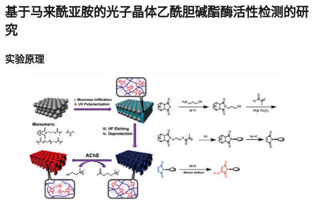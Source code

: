 \documentclass{beamer}
\begin{document}


\subsection{基于马来酰亚胺的光子晶体乙酰胆碱酯酶活性检测的研究}
\begin{frame}
  \frametitle{实验原理}
  \begin{figure}[t]
    \centering
    \includegraphics[width=\linewidth]{figures/AChE-Principle.png}
  \end{figure}
\end{frame}
\end{document}
